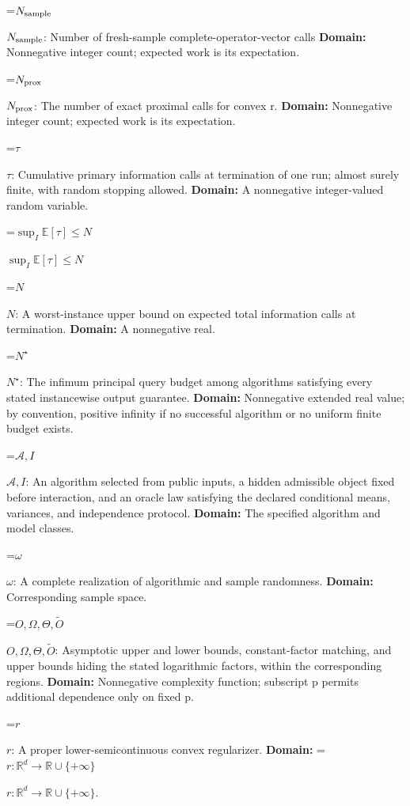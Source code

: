 \documentclass[10pt,a4paper]{article}
\newcommand{\AtlasMath}[1]{\par\begingroup\centering\setbox0=\hbox{$\displaystyle #1$}\ifdim\wd0>1.4\linewidth\typeout{ATLAS WIDE FORMULA: \the\wd0}\fi\ifdim\wd0>\linewidth\resizebox{\linewidth}{!}{\box0}\else\box0\fi\par\endgroup}
\newcommand{\AtlasInlineMath}[1]{\begingroup\setbox0=\hbox{$#1$}\ifdim\wd0>.4\linewidth\endgroup\AtlasMath{#1}\else\endgroup$#1$\fi}
\begin{document}
\AtlasInlineMath{N_{\rm sample}}: Number of fresh-sample complete-operator-vector calls \textbf{Domain:} Nonnegative integer count; expected work is its expectation.



\AtlasInlineMath{N_{\rm prox}}: The number of exact proximal calls for convex r. \textbf{Domain:} Nonnegative integer count; expected work is its expectation.



\AtlasInlineMath{\tau}: Cumulative primary information calls at termination of one run; almost surely finite, with random stopping allowed. \textbf{Domain:} A nonnegative integer-valued random variable.



\AtlasInlineMath{\sup_I\mathbb E[\tau]\le N}



\AtlasInlineMath{N}: A worst-instance upper bound on expected total information calls at termination. \textbf{Domain:} A nonnegative real.



\AtlasInlineMath{N^\star}: The infimum principal query budget among algorithms satisfying every stated instancewise output guarantee. \textbf{Domain:} Nonnegative extended real value; by convention, positive infinity if no successful algorithm or no uniform finite budget exists.



\AtlasInlineMath{\mathcal A,I}: An algorithm selected from public inputs, a hidden admissible object fixed before interaction, and an oracle law satisfying the declared conditional means, variances, and independence protocol. \textbf{Domain:} The specified algorithm and model classes.



\AtlasInlineMath{\omega}: A complete realization of algorithmic and sample randomness. \textbf{Domain:} Corresponding sample space.



\AtlasInlineMath{O,\Omega,\Theta,\widetilde O}: Asymptotic upper and lower bounds, constant-factor matching, and upper bounds hiding the stated logarithmic factors, within the corresponding regions. \textbf{Domain:} Nonnegative complexity function; subscript p permits additional dependence only on fixed p.



\AtlasInlineMath{r}: A proper lower-semicontinuous convex regularizer. \textbf{Domain:} \AtlasInlineMath{r:\mathbb R^d\to\mathbb R\cup\{+\infty\}}.
\end{document}

